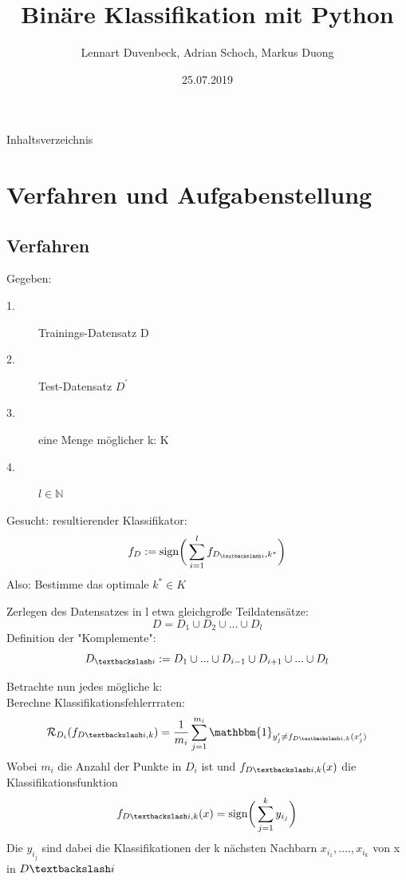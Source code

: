 \documentclass{beamer}
\title{Binäre Klassifikation mit Python}
\author{Lennart Duvenbeck, Adrian Schoch, Markus Duong}
\date{25.07.2019}
\begin{document}
\maketitle
\begin{frame}{Inhaltsverzeichnis}
  \tableofcontents
\end{frame}


\section{Verfahren und Aufgabenstellung}

\subsection{Verfahren}
\begin{frame}
Gegeben: 
\begin{description}
\item[1.] Trainings-Datensatz D
\item[2.] Test-Datensatz $D^{'}$
\item[3.] eine Menge möglicher k: K
\item[4.] $l \in \mathbb{N}$ 
\end{description}
Gesucht: resultierender Klassifikator: 
\[
f_ {D} := \text{sign} \bigg( \sum_{i=1}^{l} f_{D_{\textbackslash i}, k^{*}}\bigg)
\]
Also: Bestimme das optimale $k^* \in K$
\end{frame}



\begin{frame}
Zerlegen des Datensatzes in l etwa gleichgroße Teildatensätze:
\[
D= D_1 \cup D_2 \cup ... \cup D_l
\]
Definition der "Komplemente":
\[
D_{\textbackslash i} := D_{1} \cup ... \cup D_{i-1} \cup D_{i+1} \cup...\cup D_{l}
\]
\end{frame}


\begin{frame}
Betrachte nun jedes mögliche k:\\
Berechne Klassifikationsfehlerrraten:
\[ \mathcal{R}_{D_i}(f_{D \textbackslash i ,k})= \frac{1}{m_i} \sum_{j=1}^{m_i} \mathbbm{1}_{y_{j}' \neq f_{D \textbackslash i ,k}(x_{j}')}
\]
Wobei $m_i$ die Anzahl der Punkte in $D_i$ ist und $f_{D \textbackslash i ,k}(x)$ die Klassifikationsfunktion
\[f_{D \textbackslash i ,k}(x) = \text{sign} \bigg( \sum_{j =1}^{k} y_{i_{j}}\bigg)
\]
Die $y_{i_j}$ sind dabei die Klassifikationen der k nächsten Nachbarn 
$x_{i_1},....,x_{i_k}$ von x in $D \textbackslash i$
\end{frame}
\end{document}
